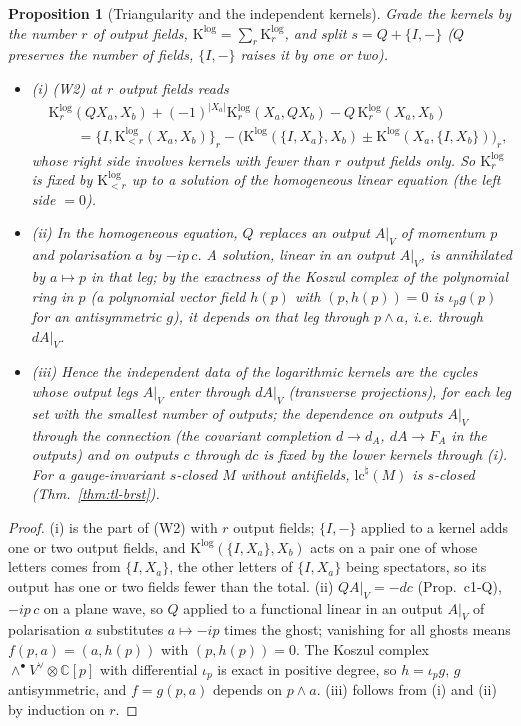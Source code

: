 \documentclass[11pt]{article}
\numberwithin{equation}{section}
\theoremstyle{plain}
\newtheorem{proposition}[theorem]{Proposition}
\theoremstyle{definition}
\begin{document}
\begin{proposition}[Triangularity and the independent kernels]
\label{prop:tl-reduction}
Grade the kernels by the number $r$ of output fields, $\mathrm K^{\log}=\sum_r\mathrm K^{\log}_{r}$, and split $s=Q+\{I,-\}$ ($Q$ preserves the number of fields, $\{I,-\}$ raises it by one or two).
\begin{itemize}
\item (i) (W2) at $r$ output fields reads
\[
\begin{aligned}&\mathrm K^{\log}_r(QX_a,X_b)+(-1)^{|X_a|}\mathrm K^{\log}_r(X_a,QX_b)-Q\,\mathrm K^{\log}_r(X_a,X_b)\\ &\qquad=\{I,\mathrm K^{\log}_{<r}(X_a,X_b)\}_{r}-\big(\mathrm K^{\log}(\{I,X_a\},X_b)\pm\mathrm K^{\log}(X_a,\{I,X_b\})\big)_r ,\end{aligned}
\]
whose right side involves kernels with fewer than $r$ output fields only. So $\mathrm K^{\log}_r$ is fixed by $\mathrm K^{\log}_{<r}$ up to a solution of the homogeneous linear equation (the left side $=0$).
\item (ii) In the homogeneous equation, $Q$ replaces an output $A|_V$ of momentum $p$ and polarisation $a$ by $-ip\,c$. A solution, linear in an output $A|_V$, is annihilated by $a\mapsto p$ in that leg; by the exactness of the Koszul complex of the polynomial ring in $p$ (a polynomial vector field $h(p)$ with $(p,h(p))=0$ is $\iota_pg(p)$ for an antisymmetric $g$), it depends on that leg through $p\wedge a$, i.e. through $dA|_V$.
\item (iii) Hence the independent data of the logarithmic kernels are the cycles whose output legs $A|_V$ enter through $dA|_V$ (transverse projections), for each leg set with the smallest number of outputs; the dependence on outputs $A|_V$ through the connection (the covariant completion $d\to d_A$, $dA\to F_A$ in the outputs) and on outputs $c$ through $dc$ is fixed by the lower kernels through (i). For a gauge-invariant $s$-closed $M$ without antifields, $\mathrm{lc}^\natural(M)$ is $s$-closed (Thm.~\ref{thm:tl-brst}).
\end{itemize}
\end{proposition}

\begin{proof}
(i) is the part of (W2) with $r$ output fields; $\{I,-\}$ applied to a kernel adds one or two output fields, and $\mathrm K^{\log}(\{I,X_a\},X_b)$ acts on a pair one of whose letters comes from $\{I,X_a\}$, the other letters of $\{I,X_a\}$ being spectators, so its output has one or two fields fewer than the total. (ii) $QA|_V=-dc$ (Prop.~c1-Q), $-ip\,c$ on a plane wave, so $Q$ applied to a functional linear in an output $A|_V$ of polarisation $a$ substitutes $a\mapsto-ip$ times the ghost; vanishing for all ghosts means $f(p,a)=(a,h(p))$ with $(p,h(p))=0$. The Koszul complex $\wedge^\bullet V^\vee\otimes\mathbb C[p]$ with differential $\iota_p$ is exact in positive degree, so $h=\iota_pg$, $g$ antisymmetric, and $f=g(p,a)$ depends on $p\wedge a$. (iii) follows from (i) and (ii) by induction on $r$.
\end{proof}
\end{document}
